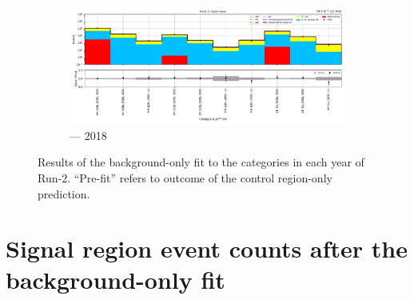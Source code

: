 \begin{figure}[htbp]
    \begin{subfigure}[b]{0.9\textwidth}
        \includegraphics[width=\textwidth]{chapters/higgstoinv/figures/mountain_ranges/2018/VH/SR_tree_fit_b-abs_values_VH_cats.pdf}
        \caption{\VH --- 2018}
    \end{subfigure}
    \caption[Results of the background-only fit to the \VH categories in each year of Run-2]{Results of the background-only fit to the \VH categories in each year of Run-2. ``Pre-fit'' refers to outcome of the control region-only prediction.}
    \label{fig:htoinv_mountain_range_B_only_VH_SR}
\end{figure}

\clearpage




\section{Signal region event counts after the background-only fit}
\label{sec:yield_tables_SR_B_only_fit}



